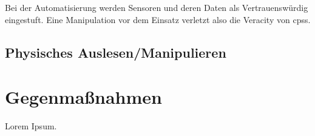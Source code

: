 \documentclass[final,bibliography=totocnumbered]{include/sikseminar}
\newcommand{\cps}{\glspl{cps}\xspace}
\begin{document}
Bei der Automatisierung werden Sensoren und deren Daten als Vertrauenswürdig eingestuft.
Eine Manipulation vor dem Einsatz verletzt also die Veracity von \cps.

\subsection{Physisches Auslesen/Manipulieren}


%



\section{Gegenmaßnahmen}\label{sec:gegenmassnahmen}





%

Lorem Ipsum.
\end{document}
